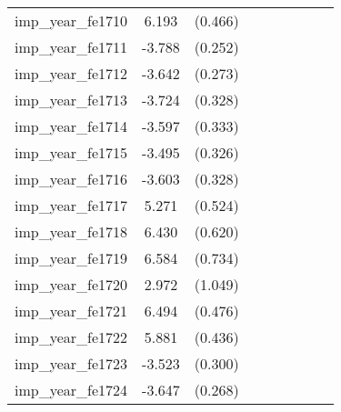 {\begin{tabular}{l*{4}{cc}}
imp\_year\_fe1710&    6.193\sym{***}&  (0.466)&                  &         &                  &         &                  &         \\
imp\_year\_fe1711&   -3.788\sym{***}&  (0.252)&                  &         &                  &         &                  &         \\
imp\_year\_fe1712&   -3.642\sym{***}&  (0.273)&                  &         &                  &         &                  &         \\
imp\_year\_fe1713&   -3.724\sym{***}&  (0.328)&                  &         &                  &         &                  &         \\
imp\_year\_fe1714&   -3.597\sym{***}&  (0.333)&                  &         &                  &         &                  &         \\
imp\_year\_fe1715&   -3.495\sym{***}&  (0.326)&                  &         &                  &         &                  &         \\
imp\_year\_fe1716&   -3.603\sym{***}&  (0.328)&                  &         &                  &         &                  &         \\
imp\_year\_fe1717&    5.271\sym{***}&  (0.524)&                  &         &                  &         &                  &         \\
imp\_year\_fe1718&    6.430\sym{***}&  (0.620)&                  &         &                  &         &                  &         \\
imp\_year\_fe1719&    6.584\sym{***}&  (0.734)&                  &         &                  &         &                  &         \\
imp\_year\_fe1720&    2.972\sym{**} &  (1.049)&                  &         &                  &         &                  &         \\
imp\_year\_fe1721&    6.494\sym{***}&  (0.476)&                  &         &                  &         &                  &         \\
imp\_year\_fe1722&    5.881\sym{***}&  (0.436)&                  &         &                  &         &                  &         \\
imp\_year\_fe1723&   -3.523\sym{***}&  (0.300)&                  &         &                  &         &                  &         \\
imp\_year\_fe1724&   -3.647\sym{***}&  (0.268)&                  &         &                  &         &                  &         \\

\end{tabular}}
